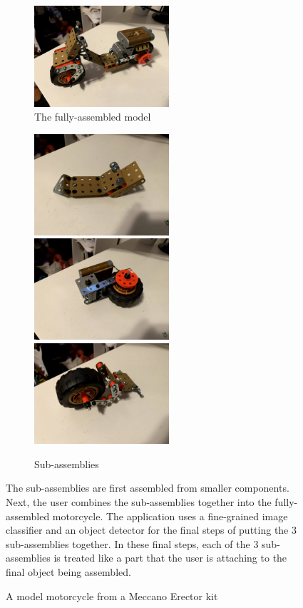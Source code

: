 \begin{figure}
  \begin{subfigure}{\textwidth}
    \includegraphics[width=5cm]{figures/erector/full.jpg}
    \caption{The fully-assembled model}
  \end{subfigure}
  \begin{subfigure}{\textwidth}
    \includegraphics[width=5cm]{figures/erector/sub1.jpg}
    \includegraphics[width=5cm]{figures/erector/sub2.jpg}
    \includegraphics[width=5cm]{figures/erector/sub3.jpg}
    \caption{Sub-assemblies}
  \end{subfigure}
  \begin{captiontext}
    The sub-assemblies are first assembled from smaller components.
    Next, the user combines the sub-assemblies together into the fully-assembled
    motorcycle.
    The application uses a fine-grained image classifier and an object detector
    for the final steps of putting the 3 sub-assemblies together.
    In these final steps, each of the 3 sub-assemblies is treated like a part
    that the user is attaching to the final object being assembled.
  \end{captiontext}
  \caption{A model motorcycle from a Meccano Erector kit}\label{fig:erector}
\end{figure}

